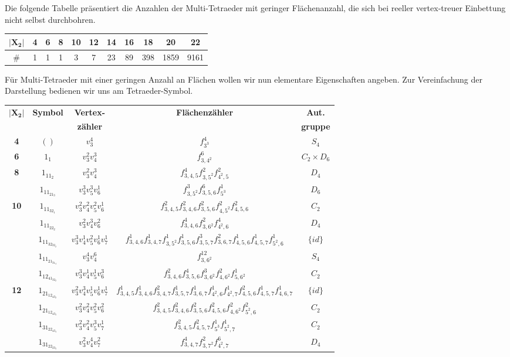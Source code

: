 \documentclass[12pt,titlepage,twoside,cleardoublepage]{article}
\theoremstyle{nummermitklammern}
\numberwithin{equation}{section}
\begin{document}
Die folgende Tabelle präsentiert die Anzahlen der Multi-Tetraeder mit geringer Flächenanzahl, die sich bei reeller vertex-treuer Einbettung nicht selbst durchbohren.  
\begin{center}
\begin{tabular}{|c|c|c|c|c|c|c|c|c|c|c|}
\hline
$\vert\textbf{X}_{\textbf{2}}\vert$&\textbf{4}&\textbf{6}&\textbf{8}&\textbf{10}&\textbf{12}&\textbf{14}&\textbf{16}&\textbf{18}&\textbf{20}&\textbf{22}\\
\hline
$\#$&1&1&1&3&7&23&89&398&1859&9161\\
\hline
\end{tabular}
\end{center} 
Für Multi-Tetraeder mit einer geringen Anzahl an Flächen wollen wir nun elementare Eigenschaften angeben. Zur Vereinfachung der Darstellung bedienen wir uns am Tetraeder-Symbol.
\begin{center}
{\footnotesize
\begin{tabular}[h]{|c|c|c|c|c|}
\hline
$\vert\textbf{X}_{\textbf{2}}\vert$ & \textbf{Symbol} & \textbf{Vertex-}& \textbf{Flächenzähler} & \textbf{Aut.} \\
 &&\textbf{zähler}&& \textbf{gruppe}\\
\hline
\textbf{4} & $()$ &$v_3^4$ & $f_{3^3}^4$ &$S_4$\\
\hline
\textbf{6} & $1_1$ & $v_3^2v_4^3$&$f^6_{3,4^2}$ &$C_2\times D_6$\\
\hline
\textbf{8} & $1_11_2$&$ v_3^2v_4^3$& $f^4_{3,4,5}f^2_{3,5^2}f^2_{4^2,5}$ & $D_4$\\
\hline  
  & $1_11_21_3$ & $v_3^3v_5^3v_6^1$& $f^3_{3,5^2}f^6_{3,5,6}f^1_{5^3}$ &$D_6$\\
\textbf{10}& $1_11_32_1$ &$v_3^2v_4^2v_5^2v_6^1$ & $f^2_{3,4,5}f^2_{3,4,6}f^2_{3,5,6}f^2_{4,5^2}f^2_{4,5,6}$ & $C_2$\\
  & $1_11_22_2$ &$v_3^2v_4^3v_6^2$& $f^4_{3,4,6}f^2_{3,6^2}f^4_{4^2,6}$ &$D_4$\\
\hline
  & $1_11_32_32_2$&$v_3^3v_4^1v_5^2v_6^1v_7^1$& $f^1_{3,4,6}f^1_{3,4,7}f^1_{3,5^2}f^1_{3,5,6}f^3_{3,5,7}f^2_{3,6,7}f^1_{4,5,6}f^1_{4,5,7}f^1_{5^2,6}$ &$\{id\}$\\
  & $1_11_21_31_4$& $v_3^4v_4^6$& $f^{12}_{3,6^2}$ &$S_4$\\
  & $1_12_41_32_2$&$v_3^3v_4^1v_5^1v_6^3$& $f^2_{3,4,6}f^4_{3,5,6}f^3_{3,6^2}f^2_{4,6^2}f^1_{5,6^2}$ & $C_2$\\
\textbf{12}& $1_21_12_43_2$&$v_3^2v_4^3v_5^1v_6^1v_7^1$& $f^1_{3,4,5}f^1_{3,4,6}f^2_{3,4,7}f^1_{3,5,7}f^1_{3,6,7}f^1_{4^2,6}f^1_{4^2,7}f^2_{4,5,6}f^1_{4,5,7}f^1_{4,6,7}$ &$\{id\}$\\
  & $1_21_12_43_3$& $v_3^2v_4^2v_5^2v_6^2$& $f^2_{3,4,5}f^2_{3,4,6}f^2_{3,5,6}f^2_{4,5,6}f^2_{4,6^2}f^2_{5^2,6}$&$C_2$\\
  & $1_31_22_43_4$& $v_3^2v_4^2v_5^3v_7^1$& $f^2_{3,4,5}f^2_{4,5,7}f^1_{5^3}f^1_{5^2,7}$&$C_2$\\
  & $1_31_22_23_3$& $v_3^2v_4^4v_7^2$&$f^4_{3,4,7}f^2_{3,7^2}f^6_{4^2,7}$ &$D_4$\\
 \hline
\end{tabular}
}
\end{center}
\end{document}

